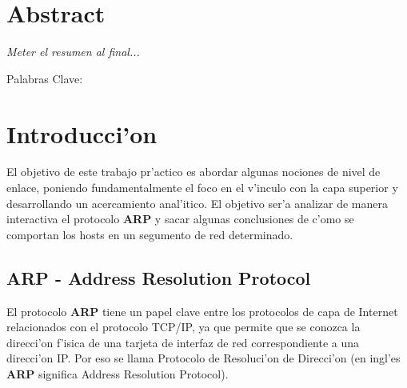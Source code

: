 \documentclass[a4paper,10pt]{article}
\begin{document}

\begin{titlepage}
\maketitle
\thispagestyle{empty}
\end{titlepage} 

\pagebreak
\tableofcontents

\pagebreak
\listoffigures

\pagebreak
\thispagestyle{fancy}

\section*{\centering Abstract}
{\em
Meter el resumen al final...
}
\vspace*{5 mm}

Palabras Clave: 


\section{Introducci'on}
\label{intro1:}

El objetivo de este trabajo pr'actico es abordar algunas nociones de nivel de enlace, poniendo fundamentalmente el foco en el v'inculo con la capa superior y desarrollando un acercamiento anal'itico. El objetivo ser'a analizar de manera interactiva el protocolo \textbf{ARP} y sacar algunas conclusiones de c'omo se comportan los hosts en un segumento de red determinado.

\subsection{ARP - Address Resolution Protocol}

El protocolo \textbf{ARP} tiene un papel clave entre los protocolos de capa de Internet relacionados con el protocolo TCP/IP, ya que permite que se conozca la direcci'on f'isica de una tarjeta de interfaz de red correspondiente a una direcci'on IP. Por eso se llama Protocolo de Resoluci'on de Direcci'on (en ingl'es \textbf{ARP} significa Address Resolution Protocol).
\end{document}
